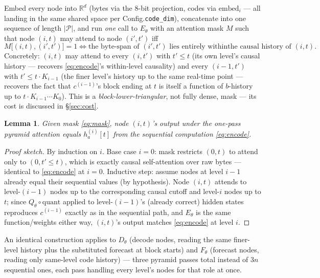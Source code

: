 \documentclass[11pt]{article}
\newtheorem{lemma}{Lemma}
\begin{document}
Embed every node into $\mathbb{R}^d$ (bytes via the $8$-bit projection,
codes via $\mathrm{embed}_i$ — all landing in the same shared space per
Config.\texttt{code\_dim}), concatenate into one sequence of length
$|\mathcal{P}|$, and run \emph{one} call to $E_\theta$ with an attention
mask $M$ such that node $(i,t)$ may attend to node $(i',t')$ iff
\begin{equation}
  M\big[(i,t), (i',t')\big] = 1 \iff
  \text{the byte-span of } (i',t') \text{ lies entirely within}
  \text{the causal history of } (i,t).
  \label{eq:mask}
\end{equation}
Concretely: $(i,t)$ may attend to every $(i,t')$ with $t' \le t$ (its own
level's causal history — recovers \eqref{eq:encode}'s within-level
causality) and every $(i-1, t')$ with $t' \le t \cdot K_{i-1}$ (the finer
level's history up to the same real-time point — recovers the fact that
$c^{(i-1)}$'s block ending at $t$ is itself a function of $b$-history up
to $t \cdot K_{i-1} \cdots K_0$). This is a \emph{block-lower-triangular},
not fully dense, mask — its cost is discussed in \S\ref{sec:cost}.

\begin{lemma}
Given mask \eqref{eq:mask}, node $(i,t)$'s output under the one-pass
pyramid attention equals $h^{(i)}_a[t]$ from the sequential
computation \eqref{eq:encode}.
\end{lemma}
\begin{proof}[Proof sketch]
By induction on $i$. Base case $i=0$: mask restricts $(0,t)$ to attend
only to $(0, t' \le t)$, which is exactly causal self-attention over
raw bytes — identical to \eqref{eq:encode} at $i=0$. Inductive step:
assume nodes at level $i-1$ already equal their sequential values (by
hypothesis). Node $(i,t)$ attends to level-$(i-1)$ nodes up to the
corresponding causal cutoff and level-$i$ nodes up to $t$; since
$Q_\theta \circ \mathrm{quant}$ applied to level-$(i-1)$'s (already
correct) hidden states reproduces $c^{(i-1)}$ exactly as in the
sequential path, and $E_\theta$ is the same function/weights either way,
$(i,t)$'s output matches \eqref{eq:encode} at level $i$.
\end{proof}

An identical construction applies to $D_\theta$ (decode nodes, reading
the same finer-level history plus the substituted forecast at block
starts) and $F_\theta$ (forecast nodes, reading only same-level code
history) — three pyramid passes total instead of $3n$ sequential ones,
each pass handling every level's nodes for that role at once.
\end{document}
